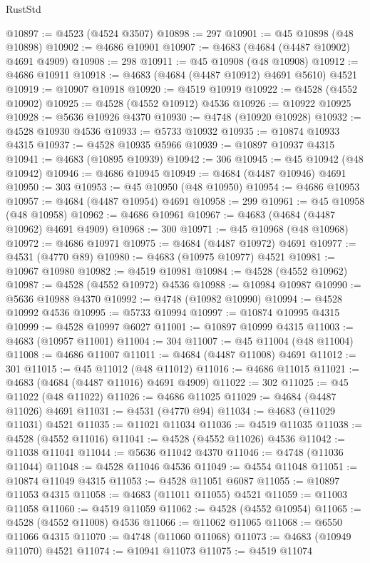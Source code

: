 \begin{lexlean}{RustStd}
\begin{coremodule}
@10897 := @4523 (@4524 @3507)
@10898 := 297
@10901 := @45 @10898 (@48 @10898)
@10902 := @4686 @10901
@10907 := @4683 (@4684 (@4487 @10902) @4691 @4909)
@10908 := 298
@10911 := @45 @10908 (@48 @10908)
@10912 := @4686 @10911
@10918 := @4683 (@4684 (@4487 @10912) @4691 @5610) @4521
@10919 := @10907 @10918
@10920 := @4519 @10919
@10922 := @4528 (@4552 @10902)
@10925 := @4528 (@4552 @10912) @4536
@10926 := @10922 @10925
@10928 := @5636 @10926 @4370
@10930 := @4748 (@10920 @10928)
@10932 := @4528 @10930 @4536
@10933 := @5733 @10932
@10935 := @10874 @10933 @4315
@10937 := @4528 @10935 @5966
@10939 := @10897 @10937 @4315
@10941 := @4683 (@10895 @10939)
@10942 := 306
@10945 := @45 @10942 (@48 @10942)
@10946 := @4686 @10945
@10949 := @4684 (@4487 @10946) @4691
@10950 := 303
@10953 := @45 @10950 (@48 @10950)
@10954 := @4686 @10953
@10957 := @4684 (@4487 @10954) @4691
@10958 := 299
@10961 := @45 @10958 (@48 @10958)
@10962 := @4686 @10961
@10967 := @4683 (@4684 (@4487 @10962) @4691 @4909)
@10968 := 300
@10971 := @45 @10968 (@48 @10968)
@10972 := @4686 @10971
@10975 := @4684 (@4487 @10972) @4691
@10977 := @4531 (@4770 @89)
@10980 := @4683 (@10975 @10977) @4521
@10981 := @10967 @10980
@10982 := @4519 @10981
@10984 := @4528 (@4552 @10962)
@10987 := @4528 (@4552 @10972) @4536
@10988 := @10984 @10987
@10990 := @5636 @10988 @4370
@10992 := @4748 (@10982 @10990)
@10994 := @4528 @10992 @4536
@10995 := @5733 @10994
@10997 := @10874 @10995 @4315
@10999 := @4528 @10997 @6027
@11001 := @10897 @10999 @4315
@11003 := @4683 (@10957 @11001)
@11004 := 304
@11007 := @45 @11004 (@48 @11004)
@11008 := @4686 @11007
@11011 := @4684 (@4487 @11008) @4691
@11012 := 301
@11015 := @45 @11012 (@48 @11012)
@11016 := @4686 @11015
@11021 := @4683 (@4684 (@4487 @11016) @4691 @4909)
@11022 := 302
@11025 := @45 @11022 (@48 @11022)
@11026 := @4686 @11025
@11029 := @4684 (@4487 @11026) @4691
@11031 := @4531 (@4770 @94)
@11034 := @4683 (@11029 @11031) @4521
@11035 := @11021 @11034
@11036 := @4519 @11035
@11038 := @4528 (@4552 @11016)
@11041 := @4528 (@4552 @11026) @4536
@11042 := @11038 @11041
@11044 := @5636 @11042 @4370
@11046 := @4748 (@11036 @11044)
@11048 := @4528 @11046 @4536
@11049 := @4554 @11048
@11051 := @10874 @11049 @4315
@11053 := @4528 @11051 @6087
@11055 := @10897 @11053 @4315
@11058 := @4683 (@11011 @11055) @4521
@11059 := @11003 @11058
@11060 := @4519 @11059
@11062 := @4528 (@4552 @10954)
@11065 := @4528 (@4552 @11008) @4536
@11066 := @11062 @11065
@11068 := @6550 @11066 @4315
@11070 := @4748 (@11060 @11068)
@11073 := @4683 (@10949 @11070) @4521
@11074 := @10941 @11073
@11075 := @4519 @11074

\end{coremodule}
\end{lexlean}
